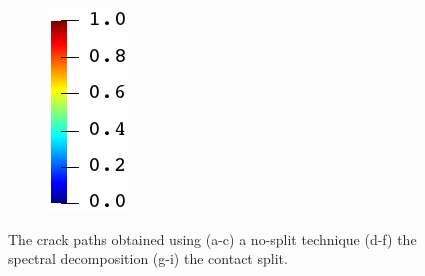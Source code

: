 \begin{figure}[htb!]
\begin{subfigure}[b]{0.065\textwidth}
    \includegraphics[width=\textwidth]{Chapter4/figures/jet_vertical.png}
    \vspace{0.15in}
  \end{subfigure}
  \caption[The crack paths for the biaxial tension test.]{The crack paths obtained using (a-c) a no-split technique (d-f) the spectral decomposition (g-i) the contact split. }
  \label{fig: Chapter4/biaxial_crack_path}
\end{figure}
